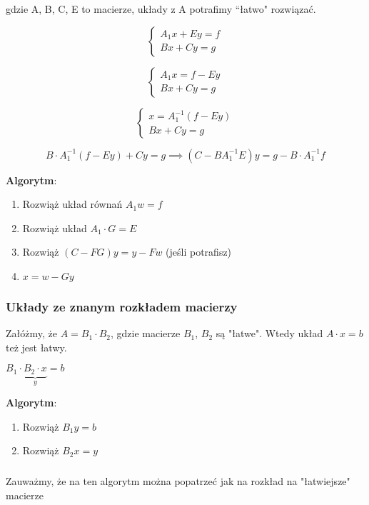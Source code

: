 \documentclass[hidelinks,a4paper,fleqn]{article}
\begin{document}
gdzie A, B, C, E to macierze, układy z A potrafimy ``łatwo" rozwiązać.

\[
	\left\{ \begin{array}{l}
	A_1x + Ey = f\\
	Bx + Cy = g
	\end{array} \right.
\]

\[
	\left\{ \begin{array}{l}
	A_1x = f - Ey\\
	Bx + Cy = g
	\end{array} \right.
\]


\[
	\left\{ \begin{array}{l}
	x = A_1^{-1}(f - Ey)\\
	Bx + Cy = g
	\end{array} \right.
\]

\[
	B \cdot A_1^{-1} (f - Ey) + Cy = g \implies (C - BA_1^{-1}E)y = g - B\cdot A_1^{-1}f
\]

\textbf{Algorytm}:

\begin{enumerate}
	\item Rozwiąż układ równań $A_1w = f$
	\item Rozwiąż układ $A_1 \cdot G = E$
	\item Rozwiąż $(C-FG)y = y - Fw$ (jeśli potrafisz)
	\item $x = w - Gy$
\end{enumerate}


\subsubsection{Układy ze znanym rozkładem macierzy}

Załóżmy, że $A = B_1 \cdot B_2$, gdzie macierze $B_1$, $B_2$ są "łatwe". Wtedy układ $A\cdot x = b$ też jest łatwy.

$B_1 \cdot \underbrace{ B_2 \cdot x}_{y} = b$

\textbf{Algorytm}:

\begin{enumerate}
	\item Rozwiąż $B_1 y = b$
	\item Rozwiąż $B_2 x = y$
\end{enumerate}

\subsubsection{}

Zauważmy, że na ten algorytm można popatrzeć jak na rozkład na "łatwiejsze" macierze
\end{document}
